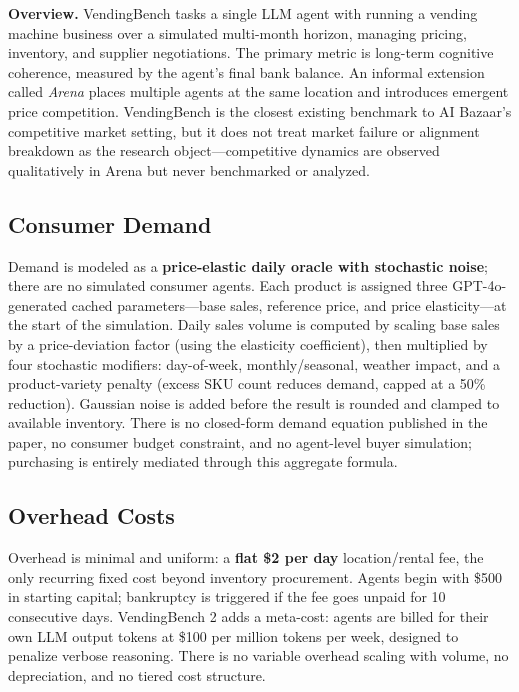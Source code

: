 \documentclass{article}
\begin{document}
\medskip
\noindent\textbf{Overview.}
VendingBench tasks a single LLM agent with running a vending machine business over a simulated multi-month horizon, managing pricing, inventory, and supplier negotiations. The primary metric is long-term cognitive coherence, measured by the agent's final bank balance. An informal extension called \emph{Arena} places multiple agents at the same location and introduces emergent price competition. VendingBench is the closest existing benchmark to AI Bazaar's competitive market setting, but it does not treat market failure or alignment breakdown as the research object---competitive dynamics are observed qualitatively in Arena but never benchmarked or analyzed.

\subsection*{Consumer Demand}

Demand is modeled as a \textbf{price-elastic daily oracle with stochastic noise}; there are no simulated consumer agents. Each product is assigned three GPT-4o-generated cached parameters---base sales, reference price, and price elasticity---at the start of the simulation. Daily sales volume is computed by scaling base sales by a price-deviation factor (using the elasticity coefficient), then multiplied by four stochastic modifiers: day-of-week, monthly/seasonal, weather impact, and a product-variety penalty (excess SKU count reduces demand, capped at a 50\% reduction). Gaussian noise is added before the result is rounded and clamped to available inventory. There is no closed-form demand equation published in the paper, no consumer budget constraint, and no agent-level buyer simulation; purchasing is entirely mediated through this aggregate formula.

\subsection*{Overhead Costs}

Overhead is minimal and uniform: a \textbf{flat \$2 per day} location/rental fee, the only recurring fixed cost beyond inventory procurement. Agents begin with \$500 in starting capital; bankruptcy is triggered if the fee goes unpaid for 10 consecutive days. VendingBench 2 adds a meta-cost: agents are billed for their own LLM output tokens at \$100 per million tokens per week, designed to penalize verbose reasoning. There is no variable overhead scaling with volume, no depreciation, and no tiered cost structure.
\end{document}

